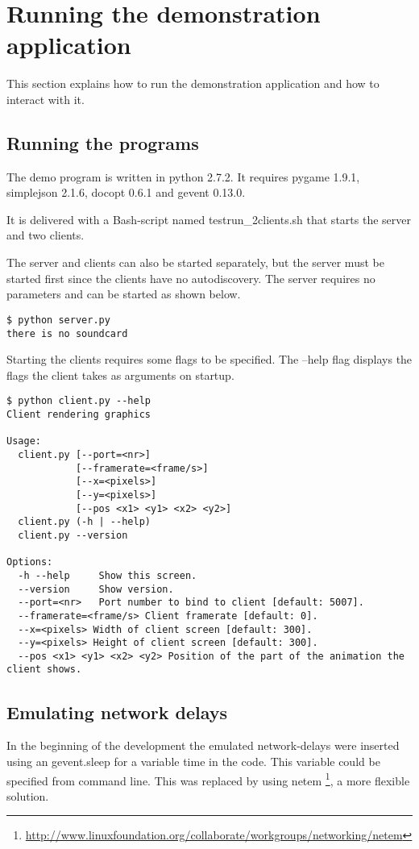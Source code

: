 \chapter{Running the demonstration application}

This section explains how to run the demonstration application and how to interact with it.  

\section{Running the programs}
The demo program is written in python 2.7.2. It requires pygame 1.9.1, simplejson 2.1.6, docopt 0.6.1 and gevent 0.13.0. 

It is delivered with a Bash-script named testrun\_2clients.sh that starts the server and two clients. 

The server and clients can also be started separately, but the server must be started first since the clients have no autodiscovery. The server requires no parameters and can be started as shown below. 

\begin{verbatim}
$ python server.py
there is no soundcard
\end{verbatim}

Starting the clients requires some flags to be specified. The --help flag displays the flags the client takes as arguments on startup. 

\begin{verbatim}
$ python client.py --help
Client rendering graphics

Usage:
  client.py [--port=<nr>]
            [--framerate=<frame/s>]
            [--x=<pixels>]
            [--y=<pixels>]
            [--pos <x1> <y1> <x2> <y2>]
  client.py (-h | --help)
  client.py --version

Options:
  -h --help     Show this screen.
  --version     Show version.
  --port=<nr>   Port number to bind to client [default: 5007].
  --framerate=<frame/s> Client framerate [default: 0].
  --x=<pixels> Width of client screen [default: 300].
  --y=<pixels> Height of client screen [default: 300].
  --pos <x1> <y1> <x2> <y2> Position of the part of the animation the client shows.
\end{verbatim}


\section{Emulating network delays}
\label{netem}
In the beginning of the development the emulated network-delays were inserted using an gevent.sleep for a variable time in the code. This variable could be specified from command line. This was replaced by using netem \footnote{\url{http://www.linuxfoundation.org/collaborate/workgroups/networking/netem}}, a more flexible solution. 

